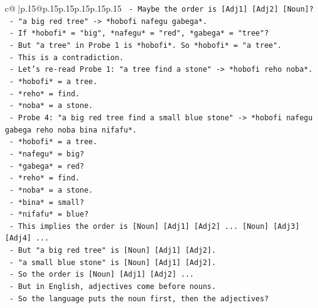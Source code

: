 \documentclass{article}
\begin{document}
{\begin{supertabular}{c@{$\;$}|p{.15\linewidth}@{}p{.15\linewidth}p{.15\linewidth}p{.15\linewidth}p{.15\linewidth}p{.15\linewidth}}
{{{\texttt{                  {-} Maybe the order is {[}Adj1{]} {[}Adj2{]} {[}Noun{]}?} \\
\texttt{                    {-} "a big red tree" {-}> *hobofi nafegu gabega*.} \\
\texttt{                    {-} If *hobofi* = "big", *nafegu* = "red", *gabega* = "tree"?} \\
\texttt{                    {-} But "a tree" in Probe 1 is *hobofi*. So *hobofi* = "a tree".} \\
\texttt{                    {-} This is a contradiction.} \\
\texttt{                  {-} Let's re{-}read Probe 1: "a tree find a stone" {-}> *hobofi reho noba*.} \\
\texttt{                    {-} *hobofi* = a tree.} \\
\texttt{                    {-} *reho* = find.} \\
\texttt{                    {-} *noba* = a stone.} \\
\texttt{                  {-} Probe 4: "a big red tree find a small blue stone" {-}> *hobofi nafegu gabega reho noba bina nifafu*.} \\
\texttt{                    {-} *hobofi* = a tree.} \\
\texttt{                    {-} *nafegu* = big?} \\
\texttt{                    {-} *gabega* = red?} \\
\texttt{                    {-} *reho* = find.} \\
\texttt{                    {-} *noba* = a stone.} \\
\texttt{                    {-} *bina* = small?} \\
\texttt{                    {-} *nifafu* = blue?} \\
\texttt{                    {-} This implies the order is {[}Noun{]} {[}Adj1{]} {[}Adj2{]} ... {[}Noun{]} {[}Adj3{]} {[}Adj4{]} ...} \\
\texttt{                    {-} But "a big red tree" is {[}Noun{]} {[}Adj1{]} {[}Adj2{]}.} \\
\texttt{                    {-} "a small blue stone" is {[}Noun{]} {[}Adj1{]} {[}Adj2{]}.} \\
\texttt{                    {-} So the order is {[}Noun{]} {[}Adj1{]} {[}Adj2{]} ...} \\
\texttt{                    {-} But in English, adjectives come before nouns.} \\
\texttt{                    {-} So the language puts the noun first, then the adjectives?} \\
}}}
\end{supertabular}}
\end{document}
